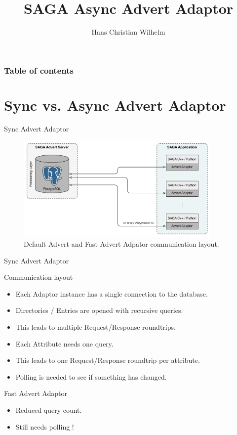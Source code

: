 \documentclass{beamer}
\title{SAGA Async Advert Adaptor}
\author[H.C. Wilhelm]{Hans Christian Wilhelm}
\begin{document}
  
  \begin{frame}
    \titlepage
  \end{frame}
  
  \begin{frame}
    \frametitle{Table of contents}
  	\tableofcontents
  \end{frame}
  
  \section{Sync vs. Async Advert Adaptor}
    \begin{frame}{Sync Advert Adaptor}
      \begin{figure}
        \includegraphics[width=10cm]{old_technology_overview}
        \caption{Default Advert and Fast Advert Adpator communication layout.}  
      \end{figure}
    \end{frame}
    
    \begin{frame}{Sync Advert Adaptor}
      \begin{block}{Communication layout}
        \begin{itemize}
          \item Each Adaptor instance has a single connection to the database.
          \item Directories / Entries are opened with recursive queries.
          \item This leads to multiple Request/Response roundtrips.
          \item Each Attribute needs one query.
          \item This leads to one Request/Response roundtrip per attribute.
          \item Polling is needed to see if something has changed.
        \end{itemize}
      \end{block}
      
      \begin{alertblock}{Fast Advert Adaptor}
             \begin{itemize}
               \item Reduced query count.
               \item Still needs polling !
             \end{itemize} 
      \end{alertblock}
    \end{frame}
    
\end{document}
